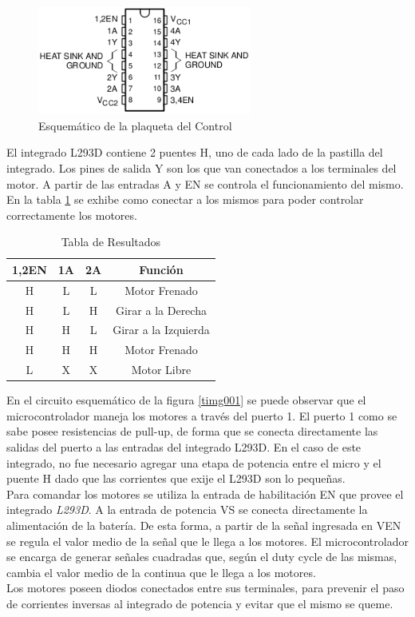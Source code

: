 \documentclass[a4paper,10pt]{article}
\begin{document}
					\begin{figure}[!htb]
						\centering
						\includegraphics[width=7cm]{Imagenes/puenteH.jpg}
						\caption{Esquemático de la plaqueta del Control} \label{timg003}
					\end{figure}

					El integrado L293D contiene 2 puentes H, uno de cada lado de la pastilla del integrado. Los pines de salida Y son los que van conectados a 
					los terminales del motor. A partir de las entradas A y EN se controla el funcionamiento del mismo. En la tabla \ref{tab001} se exhibe como 
					conectar a los mismos para poder controlar correctamente los motores.
				
					\begin{table}[!htp]
						\centering
						\begin{tabular}{|c|c|c|c|}
							\hline
							1,2EN & 1A & 2A & Función \\
							\hline
							H & L & L & Motor Frenado \\
							\hline 
							H & L	& H & Girar a la Derecha \\
							\hline
							H & H & L & Girar a la Izquierda \\
							\hline
							H & H & H &  Motor Frenado \\
							\hline
							L & X & X & Motor Libre \\	
							\hline
						\end{tabular}
					\caption{Tabla de Resultados} \label{tab001}
					\end{table}

					En el circuito esquemático de la figura \ref{timg001} se puede observar que el microcontrolador maneja los motores a través del puerto 1. El puerto 1 
					como se sabe posee resistencias de pull-up, de forma que se conecta directamente las salidas del puerto a las entradas del integrado L293D. En el caso
					de este integrado, no fue necesario agregar una etapa de potencia entre el micro y el puente H dado que las corrientes que exije el L293D son lo 
					pequeñas. \\
					\indent Para comandar los motores se utiliza la entrada de habilitación EN que provee el integrado \emph{L293D}. A la entrada de potencia
					VS se conecta directamente la alimentación de la batería.  De esta forma, a partir de la señal ingresada en VEN se regula el valor medio de la 
					señal que le llega a los motores. El microcontrolador se encarga de generar señales cuadradas que, según el duty cycle de las mismas, 
					cambia el valor medio de la continua que le llega a los motores. \\
					\indent Los motores poseen diodos conectados entre sus terminales, para prevenir el paso de corrientes inversas al integrado de potencia y evitar
					que el mismo se queme. 
\end{document}
